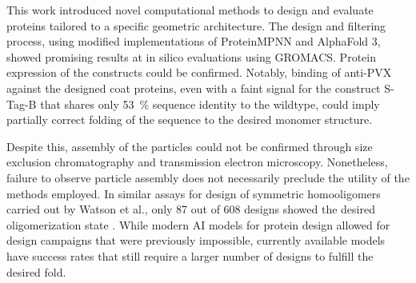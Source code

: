 
This work introduced novel computational methods to design and evaluate proteins tailored to a specific geometric architecture. The design and filtering process, using modified implementations of ProteinMPNN and AlphaFold 3, showed promising results at in silico evaluations using GROMACS. Protein expression of the constructs could be confirmed. Notably, binding of anti-PVX against the designed coat proteins, even with a faint signal for the construct S-Tag-B that shares only \SI{53}{\percent} sequence identity to the wildtype, could imply partially correct folding of the sequence to the desired monomer structure. 

Despite this, assembly of the particles could not be confirmed through size exclusion chromatography and transmission electron microscopy. Nonetheless, failure to observe particle assembly does not necessarily preclude the utility of the methods employed. In similar assays for design of symmetric homooligomers carried out by Watson et al., only 87 out of 608 designs showed the desired oligomerization state \cite{RFdiffusion}. While modern AI models for protein design allowed for design campaigns that were previously impossible, currently available models have success rates that still require a larger number of designs to fulfill the desired fold. 

